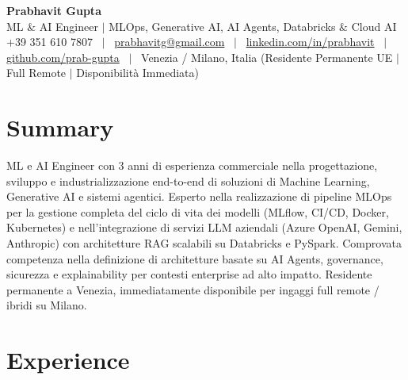 \documentclass[a4paper,10pt]{article}
\begin{document}
\begin{minipage}[c]{0.80\textwidth}
  {\Huge\bfseries Prabhavit Gupta}\\[3pt]
  {\color{accent}\large ML $\&$ AI Engineer $\vert$ MLOps, Generative AI, AI Agents, Databricks $\&$ Cloud AI}\\[6pt]
  {\footnotesize +39 351 610 7807 ~$\vert$~
  \href{mailto:prabhavitg@gmail.com}{prabhavitg@gmail.com} ~$\vert$~
  \href{https://www.linkedin.com/in/prabhavit/}{linkedin.com/in/prabhavit} ~$\vert$~
  \href{https://github.com/prab-gupta}{github.com/prab-gupta} ~$\vert$~
  Venezia / Milano, Italia (Residente Permanente UE $\vert$ Full Remote $\vert$ Disponibilità Immediata)}
\end{minipage}\hfill

\section{Summary}
ML e AI Engineer con 3 anni di esperienza commerciale nella progettazione, sviluppo e industrializzazione end-to-end di soluzioni di Machine Learning, Generative AI e sistemi agentici. Esperto nella realizzazione di pipeline MLOps per la gestione completa del ciclo di vita dei modelli (MLflow, CI/CD, Docker, Kubernetes) e nell'integrazione di servizi LLM aziendali (Azure OpenAI, Gemini, Anthropic) con architetture RAG scalabili su Databricks e PySpark. Comprovata competenza nella definizione di architetture basate su AI Agents, governance, sicurezza e explainability per contesti enterprise ad alto impatto. Residente permanente a Venezia, immediatamente disponibile per ingaggi full remote / ibridi su Milano.

\section{Experience}
\end{document}
